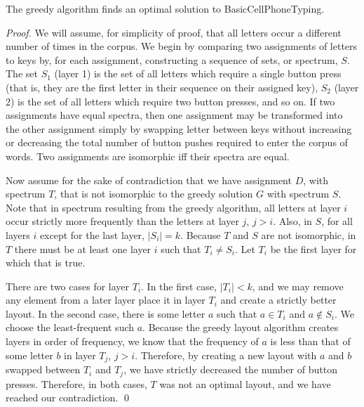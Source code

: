 \documentclass[runningheads]{llncs}
\begin{document}
\begin{theorem}
The greedy algorithm finds an optimal solution to {\sc BasicCellPhoneTyping}.
\label{basicthm}
\end{theorem}
\begin{proof}
We will assume, for simplicity of proof, that all letters occur a different number of times in the corpus.  
We begin by comparing two assignments of letters to keys by, for each assignment,
constructing a sequence of sets, or spectrum, $S$.  The set $S_1$ (layer 1) is the set of all
letters which require a single button press (that is, they are the first
letter in their sequence on their assigned key), $S_2$ (layer 2) is the set of
all letters which require two button presses, and so on.  If two assignments
have equal spectra, then one assignment may be transformed into
the other assignment simply by swapping letter between keys without
increasing or decreasing the total number of button pushes required to enter
the corpus of words.   Two assignments are isomorphic iff their spectra are equal.

Now assume for the sake of contradiction that we have assignment $D$, with spectrum $T$, that is not isomorphic to the greedy solution $G$ with spectrum $S$.
Note that in spectrum resulting from the greedy algorithm, all letters at layer
$i$ occur strictly more frequently than the letters at layer $j$, $j > i$.
Also, in $S$, for all layers $i$ except for the last layer, $|S_i| = k$.
Because $T$ and $S$ are not isomorphic, in $T$ there must be at least one layer $i$ such that $T_i \neq S_i$.  Let $T_i$ be the first layer for which that is true.

There are two cases for layer $T_i$.  In the first case, $|T_i| < k$, and we may
remove any element from a later layer place it in layer $T_i$ and create a strictly better layout.  In
the second case, there is some letter $a$ such that $a \in T_i$ and $a \not\in
S_i$.  We choose the least-frequent such $a$.  Because the greedy layout
algorithm creates layers in order of frequency, we know that the frequency of
$a$ is less than that of some letter $b$ in layer $T_j$, $j>i$.  Therefore, by
creating a new layout with $a$ and $b$ swapped between $T_i$ and $T_j$, we have
strictly decreased the number of button presses.  Therefore, in both cases,
$T$ was not an optimal layout, and we have reached our contradiction.
\qed
\end{proof}
\end{document}
